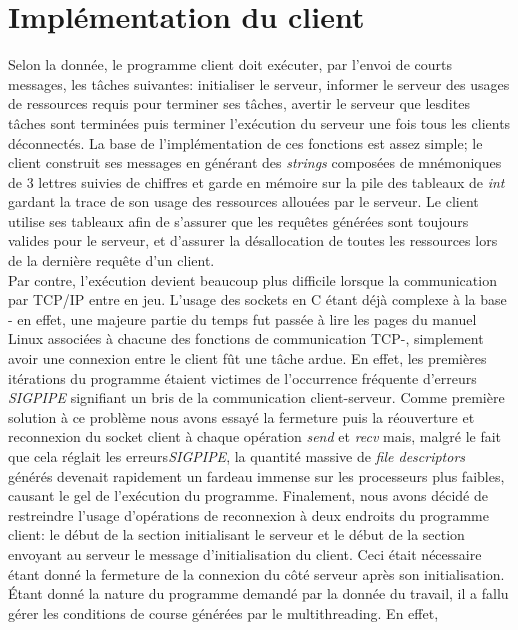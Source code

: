 \documentclass[11pt]{article}
\begin{document}
\section*{ Implémentation du client }
\setlength{\parindent}{20pt}
Selon la donnée, le programme client doit exécuter, par l'envoi de courts messages, les tâches suivantes: initialiser le serveur, informer le 
serveur des usages de ressources requis pour terminer ses tâches, avertir le serveur que lesdites tâches sont terminées puis terminer l'exécution 
du serveur une fois tous les clients déconnectés. La base de l'implémentation de ces fonctions est assez simple; le client construit ses messages 
en générant des \emph{strings} composées de mnémoniques de 3 lettres suivies de chiffres et garde en mémoire sur la pile des tableaux de \emph{int}
 gardant la trace de son usage des ressources allouées par le serveur. Le client utilise ses tableaux afin de s’assurer que les requêtes générées 
 sont toujours valides pour le serveur, et d’assurer la désallocation de toutes les ressources lors de la dernière requête d’un client.
\\
Par contre, l'exécution devient beaucoup plus difficile lorsque la communication par TCP/IP entre en jeu. L'usage des sockets en C étant déjà complexe 
à la base - en effet, une majeure partie du temps fut passée à lire les pages du manuel Linux associées à chacune des fonctions de communication TCP-, 
simplement avoir une connexion entre le client fût une tâche ardue. En effet, les premières itérations du programme étaient victimes de l'occurrence 
fréquente d'erreurs \emph{SIGPIPE} signifiant un bris de la communication client-serveur. Comme première solution à ce problème nous avons essayé la 
fermeture puis la réouverture et reconnexion du socket client à chaque opération \emph{send} et \emph{recv} mais, malgré le fait que cela réglait les 
erreurs\emph{SIGPIPE}, la quantité massive de \emph{file descriptors} générés devenait rapidement un fardeau immense sur les processeurs plus faibles, causant 
le gel de l'exécution du programme. Finalement, nous avons décidé de restreindre l'usage d'opérations de reconnexion à deux endroits du programme client: 
le début de la section initialisant le serveur et le début de la section envoyant au serveur le message d'initialisation du client. Ceci était nécessaire 
étant donné la fermeture de la connexion du côté serveur après son initialisation.
\\
Étant donné la nature du programme demandé par la donnée du travail, il a fallu gérer les conditions de course générées par le multithreading. En effet,
\end{document}
